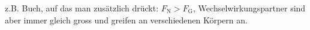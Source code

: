 z.B. Buch, auf das man zusätzlich drückt: $F_\text{N} > F_\text{G}$, Wechselwirkungspartner sind aber immer gleich gross und greifen an verschiedenen Körpern an.
